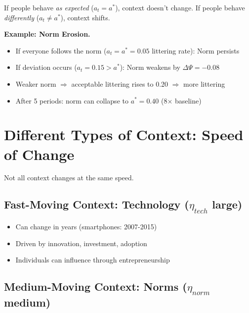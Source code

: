 \begin{intuition}
If people behave \emph{as expected} ($a_t = a^*$), context doesn't change.
If people behave \emph{differently} ($a_t \neq a^*$), context shifts.

\textbf{Example: Norm Erosion.}
\begin{itemize}[nosep]
  \item If everyone follows the norm ($a_t = a^* = 0.05$ littering rate): Norm persists
  \item If deviation occurs ($a_t = 0.15 > a^*$): Norm weakens by $\Delta\Psi = -0.08$
  \item Weaker norm $\Rightarrow$ acceptable littering rises to 0.20 $\Rightarrow$ more littering
  \item After 5 periods: norm can collapse to $a^* = 0.40$ (8× baseline)
\end{itemize}
\end{intuition}



\section{Different Types of Context: Speed of Change}
\label{sec:context-types}


Not all context changes at the same speed.

\subsection{Fast-Moving Context: Technology ($\eta_{tech}$ large)}

\begin{itemize}[nosep]
  \item Can change in years (smartphones: 2007-2015)
  \item Driven by innovation, investment, adoption
  \item Individuals can influence through entrepreneurship
\end{itemize}

\subsection{Medium-Moving Context: Norms ($\eta_{norm}$ medium)}

